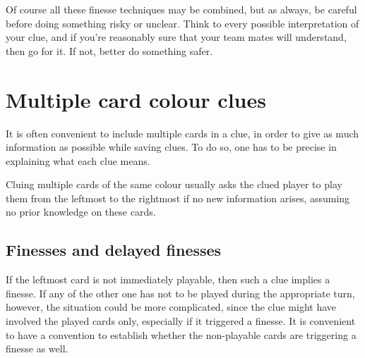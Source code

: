\documentclass[a4paper]{article}
\theoremstyle{plain}
\theoremstyle{definition}
\newtheorem{convention}[theorem]{Convention}
\begin{document}
Of course all these finesse techniques may be combined, but as always, be careful before doing something risky or unclear. Think to every possible interpretation of your clue, and if you're reasonably sure that your team mates will understand, then go for it. If not, better do something safer.

\section{Multiple card colour clues}

It is often convenient to include multiple cards in a clue, in order to give as much information as possible while saving clues. To do so, one has to be precise in explaining what each clue means.

Cluing multiple cards of the same colour usually asks the clued player to play them from the leftmost to the rightmost if no new information arises, assuming no prior knowledge on these cards.

\subsection{Finesses and delayed finesses}

If the leftmost card is not immediately playable, then such a clue implies a finesse. If any of the other one has not to be played during the appropriate turn, however, the situation could be more complicated, since the clue might have involved the played cards only, especially if it triggered a finesse. It is convenient to have a convention to establish whether the non-playable cards are triggering a finesse as well.

\end{document}
